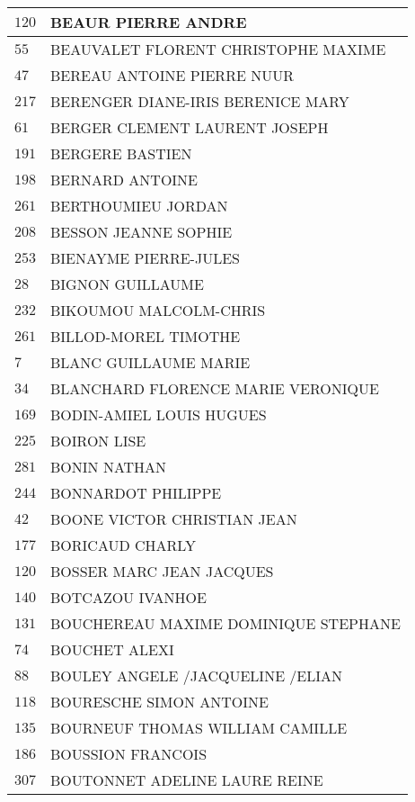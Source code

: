 \begin{xltabular}{\linewidth}{|l|X|}
    \hline
    $120$ & BEAUR PIERRE ANDRE \\
    \hline
    $55$ & BEAUVALET FLORENT CHRISTOPHE MAXIME \\
    \hline
    $47$ & BEREAU ANTOINE PIERRE NUUR \\
    \hline
    $217$ & BERENGER DIANE-IRIS BERENICE MARY \\
    \hline
    $61$ & BERGER CLEMENT LAURENT JOSEPH \\
    \hline
    $191$ & BERGERE BASTIEN \\
    \hline
    $198$ & BERNARD ANTOINE \\
    \hline
    $261$ & BERTHOUMIEU JORDAN \\
    \hline
    $208$ & BESSON JEANNE SOPHIE \\
    \hline
    $253$ & BIENAYME PIERRE-JULES \\
    \hline
    $28$ & BIGNON GUILLAUME \\
    \hline
    $232$ & BIKOUMOU MALCOLM-CHRIS \\
    \hline
    $261$ & BILLOD-MOREL TIMOTHE \\
    \hline
    $7$ & BLANC GUILLAUME MARIE \\
    \hline
    $34$ & BLANCHARD FLORENCE MARIE VERONIQUE \\
    \hline
    $169$ & BODIN-AMIEL LOUIS HUGUES \\
    \hline
    $225$ & BOIRON LISE \\
    \hline
    $281$ & BONIN NATHAN \\
    \hline
    $244$ & BONNARDOT PHILIPPE \\
    \hline
    $42$ & BOONE VICTOR CHRISTIAN JEAN \\
    \hline
    $177$ & BORICAUD CHARLY \\
    \hline
    $120$ & BOSSER MARC JEAN JACQUES \\
    \hline
    $140$ & BOTCAZOU IVANHOE \\
    \hline
    $131$ & BOUCHEREAU MAXIME DOMINIQUE STEPHANE \\
    \hline
    $74$ & BOUCHET ALEXI \\
    \hline
    $88$ & BOULEY ANGELE /JACQUELINE /ELIAN \\
    \hline
    $118$ & BOURESCHE SIMON ANTOINE \\
    \hline
    $135$ & BOURNEUF THOMAS WILLIAM CAMILLE \\
    \hline
    $186$ & BOUSSION FRANCOIS \\
    \hline
    $307$ & BOUTONNET ADELINE LAURE REINE \\

\end{xltabular}
